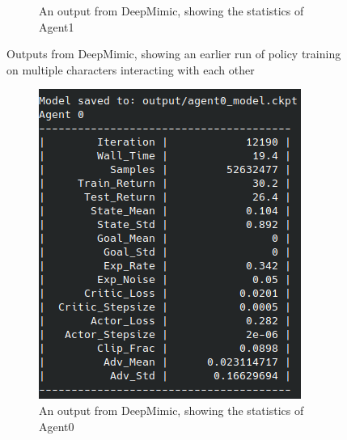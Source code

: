 \documentclass{l4proj}
\begin{document}
\begin{figure}
\begin{subfigure}[b]{0.45\textwidth}
    \caption{An output from DeepMimic, showing the statistics of Agent1}
    \label{fig:earlymultipletrainingresults2}
  \end{subfigure}
  \caption{Outputs from DeepMimic, showing an earlier run of policy training on multiple characters interacting with each other}
  \label{fig:earlymultipletrainingresults}
\end{figure}

\begin{figure}
  \begin{subfigure}[b]{0.45\textwidth}
    \includegraphics[width=\textwidth]{images/agent0_later_training.png}
    \caption{An output from DeepMimic, showing the statistics of Agent0}
    \label{fig:multipletrainingresults1}
  \end{subfigure}
  \begin{subfigure}[b]{0.45\textwidth}

\end{subfigure}
\end{figure}
\end{document}
